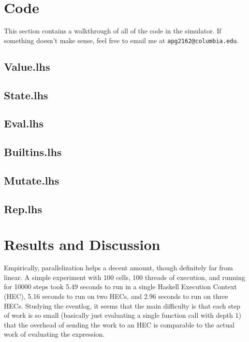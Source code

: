 \documentclass[letterpaper,11pt]{article}
\begin{document}
\newpage
\section{Code}
This section contains a walkthrough of all of the code in the simulator. If something doesn't make sense, feel free to email me at \texttt{apg2162@columbia.edu}.
\subsection{Value.lhs}


\newpage
\subsection{State.lhs}


\newpage
\subsection{Eval.lhs}


\newpage
\subsection{Builtins.lhs}


\newpage
\subsection{Mutate.lhs}


\newpage
\subsection{Rep.lhs}


\newpage
\section{Results and Discussion}
Empirically, parallelization helps a decent amount, though definitely far from linear. A simple experiment with 100 cells, 100 threads of execution, and running for 10000 steps took 5.49 seconds to run in a single Haskell Execution Context (HEC), 5.16 seconds to run on two HECs, and 2.96 seconds to run on three HECs. Studying the eventlog, it seems that the main difficulty is that each step of work is so small (basically just evaluating a single function call with depth 1) that the overhead of sending the work to an HEC is comparable to the actual work of evaluating the expression.
\end{document}
